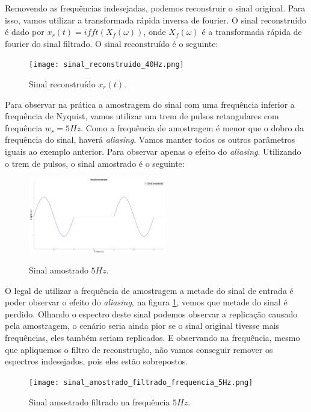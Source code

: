 \documentclass[]{IEEEtran}
\begin{document}
Removendo as frequências indesejadas, podemos reconstruir o sinal original. Para isso, vamos utilizar a transformada rápida inversa de fourier. O sinal reconstruído é dado por $x_r(t) = ifft(X_f(\omega))$, onde $X_f(\omega)$ é a transformada rápida de fourier do sinal filtrado. O sinal reconstruído é o seguinte:

\begin{figure}[H]
\captionsetup{justification=centering}
\centering %
\texttt{[image: sinal\_reconstruido\_40Hz.png]} %
\caption{Sinal reconstruído $x_r(t)$.}
\end{figure}

Para observar na prática a amostragem do sinal com uma frequência inferior a frequência de Nyquist, vamos utilizar um trem de pulsos retangulares com frequência $w_s = 5Hz$. Como a frequência de amostragem é menor que o dobro da frequência do sinal, haverá \textit{aliasing}. Vamos manter todos os outros parâmetros iguais ao exemplo anterior. Para observar apenas o efeito do \textit{aliasing}. Utilizando o trem de pulsos, o sinal amostrado é o seguinte:

\begin{figure}[H]
\captionsetup{justification=centering}
\centering %
\includegraphics[width=6cm]{sinal_amostrado_5Hz.png} %
\label{fig:sinal_amostrado_5Hz}
\caption{Sinal amostrado $5Hz$.}
\end{figure}

O legal de utilizar a frequência de amostragem a metade do sinal de entrada é poder observar o efeito do \textit{aliasing}, na figura \ref{fig:sinal_amostrado_5Hz}, vemos que metade do sinal é perdido. Olhando o espectro deste sinal podemos observar a replicação causado pela amostragem, o cenário seria ainda pior se o sinal original tivesse mais frequências, eles também seriam replicados. E observando na frequência, mesmo que apliquemos o filtro de reconstrução, não vamos conseguir remover os espectros indesejados, pois eles estão sobrepostos.

\begin{figure}[H]
\captionsetup{justification=centering}
\centering %
\texttt{[image: sinal\_amostrado\_filtrado\_frequencia\_5Hz.png]} %
\caption{Sinal amostrado filtrado na frequência $5Hz$.}
\end{figure}
\end{document}
